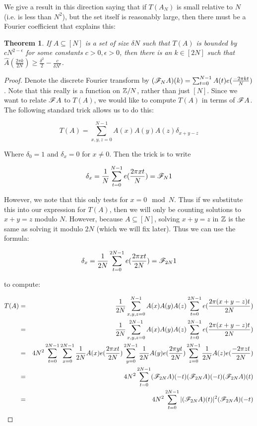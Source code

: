 \documentclass{report}
\newtheorem{theorem}{Theorem}[section]
\theoremstyle{remark}
\numberwithin{equation}{section}
\begin{document}
We give a result in this direction saying that if $T(A_N)$ is small
relative to $N$ (i.e. is less than $N^2$), but the set itself is
reasonably large, then there must be a Fourier coefficient that
explains this: 

\begin{theorem}\label{thm:alpha_finitary}
  If $A \subseteq [N]$ is a set of size $\delta N$ such that $T(A)$ is
  bounded by $c N^{2-\epsilon}$ for some constants
  $c > 0, \epsilon > 0$, then there is an $k \in [2N]$ such that
  $\widehat{A}(\frac{2\pi k}{2N}) \geq \frac{\delta^2}{2} - \frac{c}{\delta
    N^\epsilon}$.
\end{theorem}

\begin{proof}
  Denote the discrete Fourier transform by
  $(\mathscr{F}_N A)(k) = \sum_{t=0}^{N-1} A(t) e(\frac{-2\pi k t}{N})$.
  Note that this really is a function on $\mathbb{Z}/N$, rather than just
  $[N]$.  Since we want to relate $\mathscr{F} A$ to $T(A)$, we would like to
  compute $T(A)$ in terms of $\mathscr{F} A$.  The following standard trick
  allows us to do this: 

  \[T(A) = \sum_{x, y, z = 0}^{N-1} A(x)A(y)A(z)\delta_{x+y-z}\]

  Where $\delta_0 = 1$ and $\delta_x = 0$ for $x \neq 0$.  Then the
  trick is to write 

  \[\delta_x = \frac{1}{N} \sum_{t=0}^{N-1} e(\frac{2\pi x t}{N}) = \mathscr{F}_N 1\]

  However, we note that this only tests for $x = 0 \mod{N}$.  Thus if
  we substitute this into our expression for $T(A)$, then we will only
  be counting solutions to $x+y=z$ modulo $N$.  However, because
  $A \subseteq [N]$, solving $x+y=z$ in $\mathbb{Z}$ is the same as solving it
  modulo $2N$ (which we will fix later).  Thus we can use the formula:

  \[\delta_x = \frac{1}{2N} \sum_{t=0}^{2N-1} e(\frac{2\pi x t}{2N}) = \mathscr{F}_{2N} 1\]

  to compute: 

  \begin{eqnarray*}
    T(A) &=& \frac{1}{2N}\sum_{x, y, z = 0}^{N-1} A(x)A(y)A(z)\sum_{t=0}^{2N-1}
             e(\frac{2\pi (x+y-z) t}{2N})\\
         &=& \frac{1}{2N}\sum_{x, y, z = 0}^{2N-1} A(x)A(y)A(z)\sum_{t=0}^{2N-1}
             e(\frac{2\pi (x+y-z) t}{2N})\\
         &=& 4N^2 \sum_{t=0}^{2N-1}
             \sum_{x=0}^{2N-1} \frac{1}{2N} A(x)e(\frac{2\pi x t}{2N}) 
             \sum_{y=0}^{2N-1} \frac{1}{2N} A(y)e(\frac{2\pi y t}{2N}) 
             \sum_{z=0}^{2N-1} \frac{1}{2N} A(z)e(\frac{-2\pi z t}{2N})\\
         &=& 4 N^2 \sum_{t=0}^{2N-1} (\mathscr{F}_{2N}A)(-t)(\mathscr{F}_{2N}A)(-t)(\mathscr{F}_{2N}A)(t)\\
         &=& 4 N^2 \sum_{t=0}^{2N-1} |(\mathscr{F}_{2N}A)(t)|^2(\mathscr{F}_{2N}A)(-t)
  \end{eqnarray*}
  

\end{proof}
\end{document}
